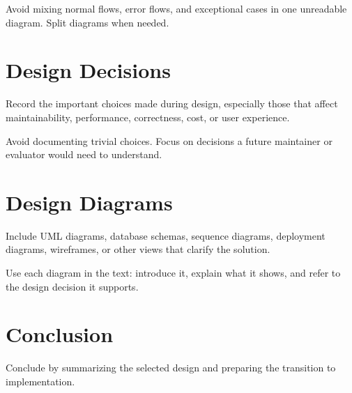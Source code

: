 Avoid mixing normal flows, error flows, and exceptional cases in one unreadable diagram. Split diagrams when needed.

\section{Design Decisions}
Record the important choices made during design, especially those that affect maintainability, performance, correctness, cost, or user experience.

Avoid documenting trivial choices. Focus on decisions a future maintainer or evaluator would need to understand.

\section{Design Diagrams}
Include UML diagrams, database schemas, sequence diagrams, deployment diagrams, wireframes, or other views that clarify the solution.

Use each diagram in the text: introduce it, explain what it shows, and refer to the design decision it supports.

\section{Conclusion}
Conclude by summarizing the selected design and preparing the transition to implementation.